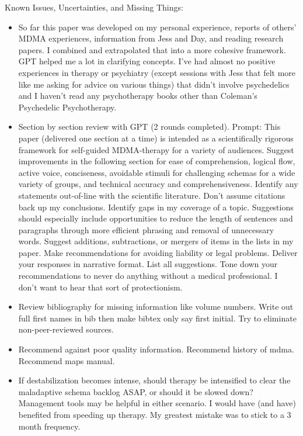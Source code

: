 \documentclass[12pt,letterpaper]{article}
\begin{document}
Known Issues, Uncertainties, and Missing Things:
\begin{itemize}
    \item So far this paper was developed on my personal experience, reports of others' MDMA experiences, information from Jess and Day, and reading research papers. I combined and extrapolated that into a more cohesive framework. GPT helped me a lot in clarifying concepts. I've had almost no positive experiences in therapy or psychiatry (except sessions with Jess that felt more like me asking for advice on various things) that didn't involve psychedelics and I haven't read any psychotherapy books other than Coleman's Psychedelic Psychotherapy.
    \item Section by section review with GPT (2 rounds completed). Prompt:
        This paper (delivered one section at a time) is intended as a scientifically rigorous framework for self-guided MDMA-therapy for a variety of audiences.
        Suggest improvements in the following section for ease of comprehension, logical flow, active voice, conciseness, avoidable stimuli for challenging schemas for a wide variety of groups, and technical accuracy and comprehensiveness.
        Identify any statements out-of-line with the scientific literature. Don't assume citations back up my conclusions. Identify gaps in my coverage of a topic.
        Suggestions should especially include opportunities to reduce the length of sentences and paragraphs through more efficient phrasing and removal of unnecessary words.
        Suggest additions, subtractions, or mergers of items in the lists in my paper.
        Make recommendations for avoiding liability or legal problems.
        Deliver your responses in narrative format. List all suggestions.
        Tone down your recommendations to never do anything without a medical professional. I don't want to hear that sort of protectionism.
    \item Review bibliography for missing information like volume numbers. Write out full first names in bib then make bibtex only say first initial. Try to eliminate non-peer-reviewed sources.
    \item Recommend against poor quality information. Recommend history of mdma. Recommend maps manual.
    \item If destabilization becomes intense, should therapy be intensified to clear the maladaptive schema backlog ASAP, or should it be slowed down? Management tools may be helpful in either scenario. I would have (and have) benefited from speeding up therapy. My greatest mistake was to stick to a 3 month frequency.

\end{itemize}
\end{document}
